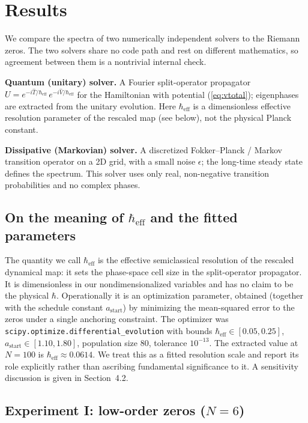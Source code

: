 \documentclass[11pt]{article}
\begin{document}
\section{Results}

We compare the spectra of two numerically independent solvers to the Riemann zeros. The two solvers share no code path and rest on different mathematics, so agreement between them is a nontrivial internal check.

\textbf{Quantum (unitary) solver.} A Fourier split-operator propagator $U = e^{-i\widehat{T}/\hbar_{\mathrm{eff}}}\,e^{-i\widehat{V}/\hbar_{\mathrm{eff}}}$ for the Hamiltonian with potential (\ref{eq:vtotal}); eigenphases are extracted from the unitary evolution. Here $\hbar_{\mathrm{eff}}$ is a dimensionless effective resolution parameter of the rescaled map (see below), not the physical Planck constant.

\textbf{Dissipative (Markovian) solver.} A discretized Fokker--Planck / Markov transition operator on a 2D grid, with a small noise $\epsilon$; the long-time steady state defines the spectrum. This solver uses only real, non-negative transition probabilities and no complex phases.

\subsection{On the meaning of $\hbar_{\mathrm{eff}}$ and the fitted parameters}

The quantity we call $\hbar_{\mathrm{eff}}$ is the effective semiclassical resolution of the rescaled dynamical map: it sets the phase-space cell size in the split-operator propagator. It is dimensionless in our nondimensionalized variables and has no claim to be the physical $\hbar$. Operationally it is an optimization parameter, obtained (together with the schedule constant $a_{\mathrm{start}}$) by minimizing the mean-squared error to the zeros under a single anchoring constraint. The optimizer was \texttt{scipy.optimize.differential\_evolution} with bounds $\hbar_{\mathrm{eff}}\in[0.05,0.25]$, $a_{\mathrm{start}}\in[1.10,1.80]$, population size $80$, tolerance $10^{-13}$. The extracted value at $N=100$ is $\hbar_{\mathrm{eff}} \approx 0.0614$. We treat this as a fitted resolution scale and report its role explicitly rather than ascribing fundamental significance to it. A sensitivity discussion is given in Section~4.2.

\subsection{Experiment I: low-order zeros ($N=6$)}
\end{document}
